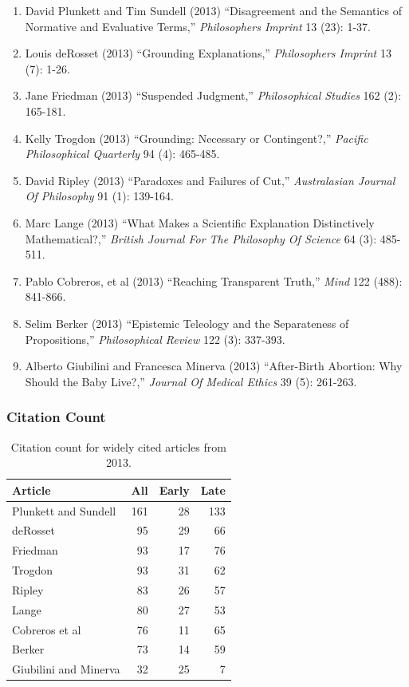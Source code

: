 \documentclass[
  10pt,
  letterpaper,
  DIV=11,
  numbers=noendperiod,
  twoside]{scrartcl}
\providecommand{\tightlist}{%
  \setlength{\itemsep}{0pt}\setlength{\parskip}{0pt}}\usepackage{longtable,booktabs,array}
\begin{document}
\begin{enumerate}
\def\labelenumi{\arabic{enumi}.}
\tightlist
\item
  David Plunkett and Tim Sundell (2013) ``Disagreement and the Semantics
  of Normative and Evaluative Terms,'' \emph{Philosophers Imprint} 13
  (23): 1-37.
\item
  Louis deRosset (2013) ``Grounding Explanations,'' \emph{Philosophers
  Imprint} 13 (7): 1-26.
\item
  Jane Friedman (2013) ``Suspended Judgment,'' \emph{Philosophical
  Studies} 162 (2): 165-181.
\item
  Kelly Trogdon (2013) ``Grounding: Necessary or Contingent?,''
  \emph{Pacific Philosophical Quarterly} 94 (4): 465-485.
\item
  David Ripley (2013) ``Paradoxes and Failures of Cut,''
  \emph{Australasian Journal Of Philosophy} 91 (1): 139-164.
\item
  Marc Lange (2013) ``What Makes a Scientific Explanation Distinctively
  Mathematical?,'' \emph{British Journal For The Philosophy Of Science}
  64 (3): 485-511.
\item
  Pablo Cobreros, et al (2013) ``Reaching Transparent Truth,''
  \emph{Mind} 122 (488): 841-866.
\item
  Selim Berker (2013) ``Epistemic Teleology and the Separateness of
  Propositions,'' \emph{Philosophical Review} 122 (3): 337-393.
\item
  Alberto Giubilini and Francesca Minerva (2013) ``After-Birth Abortion:
  Why Should the Baby Live?,'' \emph{Journal Of Medical Ethics} 39 (5):
  261-263.
\end{enumerate}

\subsubsection*{Citation Count}\label{sec-count-2013}

\begin{longtable}[]{@{}lrrr@{}}

\caption{\label{tbl-citation-count-2013}Citation count for widely cited
articles from 2013.}

\tabularnewline

\toprule\noalign{}
Article & All & Early & Late \\
\midrule\noalign{}
\endhead
\bottomrule\noalign{}
\endlastfoot
Plunkett and Sundell & 161 & 28 & 133 \\
deRosset & 95 & 29 & 66 \\
Friedman & 93 & 17 & 76 \\
Trogdon & 93 & 31 & 62 \\
Ripley & 83 & 26 & 57 \\
Lange & 80 & 27 & 53 \\
Cobreros et al & 76 & 11 & 65 \\
Berker & 73 & 14 & 59 \\
Giubilini and Minerva & 32 & 25 & 7 \\

\end{longtable}
\end{document}
